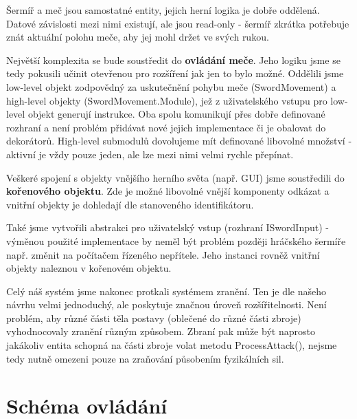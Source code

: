 Šermíř a meč jsou samostatné entity, jejich herní logika je dobře oddělená. Datové závislosti mezi nimi existují, ale jsou read-only - šermíř zkrátka potřebuje znát aktuální polohu meče, aby jej mohl držet ve svých rukou.

Největší komplexita se bude soustředit do \textbf{ovládání meče}. Jeho logiku jsme se tedy pokusili učinit otevřenou pro rozšíření jak jen to bylo možné. Oddělili jsme low-level objekt zodpovědný za uskutečnění pohybu meče (SwordMovement) a high-level objekty (SwordMovement.Module), jež z uživatelského vstupu pro low-level objekt generují instrukce. Oba spolu komunikují přes dobře definované rozhraní a není problém přidávat nové jejich implementace či je obalovat do dekorátorů. High-level submodulů dovolujeme mít definované libovolné množství - aktivní je vždy pouze jeden, ale lze mezi nimi velmi rychle přepínat. 

Veškeré spojení s objekty vnějšího herního světa (např. GUI) jsme soustředili do \textbf{kořenového objektu}. Zde je možné libovolné vnější komponenty odkázat a vnitřní objekty je dohledají dle stanoveného identifikátoru.

Také jsme vytvořili abstrakci pro uživatelský vstup (rozhraní ISwordInput) - výměnou použité implementace by neměl být problém později hráčského šermíře např. změnit na počítačem řízeného nepřítele. Jeho instanci rovněž vnitřní objekty naleznou v kořenovém objektu. 

Celý náš systém jsme nakonec protkali systémem zranění. Ten je dle našeho návrhu velmi jednoduchý, ale poskytuje značnou úroveň rozšířitelnosti. Není problém, aby různé části těla postavy (oblečené do různé části zbroje) vyhodnocovaly zranění různým způsobem. Zbraní pak může být naprosto jakákoliv entita schopná na části zbroje volat metodu ProcessAttack(), nejsme tedy nutně omezeni pouze na zraňování působením fyzikálních sil.

\section{Schéma ovládání} 

